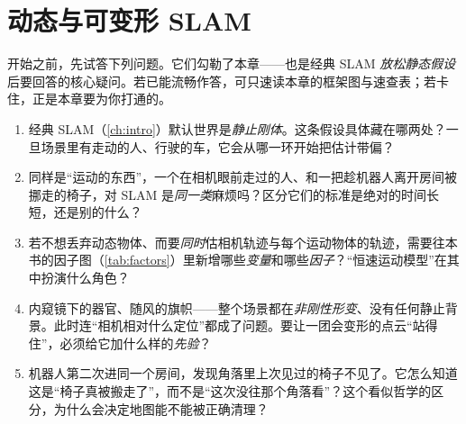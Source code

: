 \chapter{动态与可变形 SLAM}
\label{ch:dynamic}


\begin{practice}[前置自测]
开始之前，先试答下列问题。它们勾勒了本章——也是经典 SLAM \emph{放松静态假设}后要回答的核心疑问。若已能流畅作答，可只速读本章的框架图与速查表；若卡住，正是本章要为你打通的。
\begin{enumerate}
  \item 经典 SLAM（\cref{ch:intro}）默认世界是\emph{静止刚体}。这条假设具体藏在哪两处？一旦场景里有走动的人、行驶的车，它会从哪一环开始把估计带偏？
  \item 同样是“运动的东西”，一个在相机眼前走过的人、和一把趁机器人离开房间被挪走的椅子，对 SLAM 是\emph{同一类}麻烦吗？区分它们的标准是绝对的时间长短，还是别的什么？
  \item 若不想丢弃动态物体、而要\emph{同时}估相机轨迹与每个运动物体的轨迹，需要往本书的因子图（\cref{tab:factors}）里新增哪些\emph{变量}和哪些\emph{因子}？“恒速运动模型”在其中扮演什么角色？
  \item 内窥镜下的器官、随风的旗帜——整个场景都在\emph{非刚性形变}、没有任何静止背景。此时连“相机相对什么定位”都成了问题。要让一团会变形的点云“站得住”，必须给它加什么样的\emph{先验}？
  \item 机器人第二次进同一个房间，发现角落里上次见过的椅子不见了。它怎么知道这是“椅子真被搬走了”，而不是“这次没往那个角落看”？这个看似哲学的区分，为什么会决定地图能不能被正确清理？
\end{enumerate}
\end{practice}

